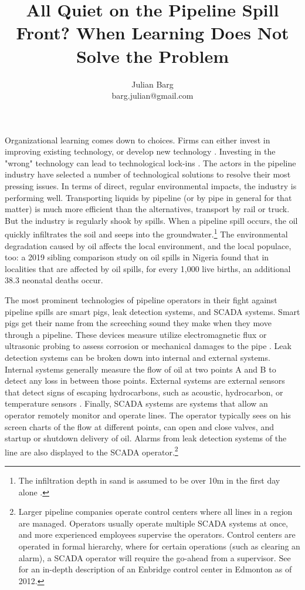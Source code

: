 \documentclass[12pt, man, natbib]{apa6}
\title{All Quiet on the Pipeline Spill Front? When Learning Does Not Solve the Problem}
\author{Julian Barg\\barg.julian@gmail.com}
\affiliation{Ivey Business School}
\begin{document}
	
	\maketitle
	
	\singlespacing
	
	\section{}
	
	Organizational learning comes down to choices. Firms can either invest in improving existing technology, or develop new technology \citep{March1991}. Investing in the "wrong" technology can lead to technological lock-ins \citep{Levinthal1993}. The actors in the pipeline industry have selected a number of technological solutions to resolve their most pressing issues. In terms of direct, regular environmental impacts, the industry is performing well. Transporting liquids by pipeline (or by pipe in general for that matter) is much more efficient than the alternatives, transport by rail or truck. But the industry is regularly shook by spills. When a pipeline spill occurs, the oil quickly infiltrates the soil and seeps into the groundwater.\footnote{The infiltration depth in sand is assumed to be over 10m in the first day alone \citep{Bonvicini2015}.} The environmental degradation caused by oil affects the local environment, and the local populace, too: a 2019 sibling comparison study on oil spills in Nigeria found that in localities that are affected by oil spills, for every 1,000 live births, an additional 38.3 neonatal deaths occur\citep{Bruederle2019}.
	
	The most prominent technologies of pipeline operators in their fight against pipeline spills are smart pigs, leak detection systems, and SCADA systems. Smart pigs get their name from the screeching sound they make when they move through a pipeline. These devices measure utilize electromagnetic flux or ultrasonic probing to assess corrosion or mechanical damages to the pipe \citep{Singh2017-7}. Leak detection systems can be broken down into internal and external systems. Internal systems generally measure the flow of oil at two points A and B to detect any loss in between those points. External systems are external sensors that detect signs of escaping hydrocarbons, such as acoustic, hydrocarbon, or temperature sensors \citep{Shaw2012}. Finally, SCADA systems are systems that allow an operator remotely monitor and operate lines. The operator typically sees on his screen charts of the flow at different points, can open and close valves, and startup or shutdown delivery of oil. Alarms from leak detection systems of the line are also displayed to the SCADA operator.\footnote{Larger pipeline companies operate control centers where all lines in a region are managed. Operators usually operate multiple SCADA systems at once, and more experienced employees supervise the operators. Control centers are operated in formal hierarchy, where for certain operations (such as clearing an alarm), a SCADA operator will require the go-ahead from a supervisor. See \citet{NTSB2012} for an in-depth description of an Enbridge control center in Edmonton as of 2012.}
\end{document}
